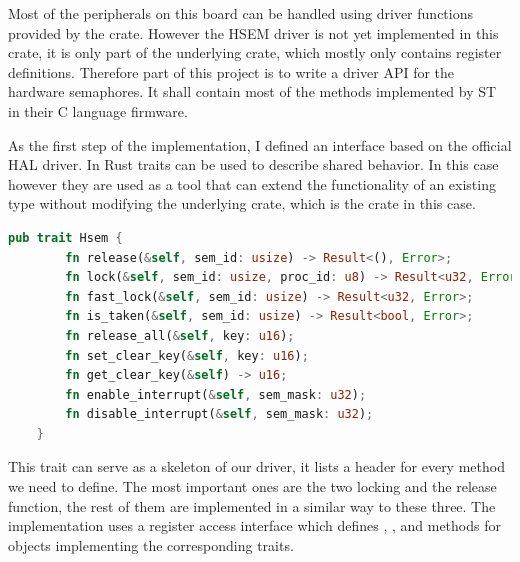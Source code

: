 Most of the peripherals on this board can be handled using driver functions provided by the  crate. However the HSEM driver is not yet implemented in this crate, it is only part of the underlying  crate, which mostly only contains register definitions. Therefore part of this project is to write a driver API for the hardware semaphores. It shall contain most of the methods implemented by ST in their C language firmware.\cite{HsemCCode}

As the first step of the implementation, I defined an interface based on the official HAL driver. In Rust traits can be used to describe shared behavior. In this case however they are used as a tool that can extend the functionality of an existing type without modifying the underlying crate, which is the  crate in this case.

\begin{lstlisting}[language=Rust,frame=single,float=!ht,style=customrust,label={lst:hsem-trait-def},caption={HSEM Trait Definition},style=customrust]
    pub trait Hsem {
        fn release(&self, sem_id: usize) -> Result<(), Error>;
        fn lock(&self, sem_id: usize, proc_id: u8) -> Result<u32, Error>;
        fn fast_lock(&self, sem_id: usize) -> Result<u32, Error>;
        fn is_taken(&self, sem_id: usize) -> Result<bool, Error>;
        fn release_all(&self, key: u16);
        fn set_clear_key(&self, key: u16);
        fn get_clear_key(&self) -> u16;
        fn enable_interrupt(&self, sem_mask: u32);
        fn disable_interrupt(&self, sem_mask: u32);
    }
\end{lstlisting}

This trait can serve as a skeleton of our driver, it lists a header for every method we need to define. The most important ones are the two locking and the release function, the rest of them are implemented in a similar way to these three. The implementation uses a register access interface which defines , , and  methods for objects implementing the corresponding traits.

